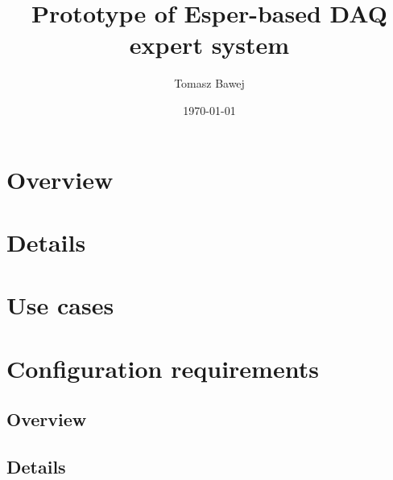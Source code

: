 \documentclass[11pt,oneside,a4paper]{article}
\title{Prototype of Esper-based DAQ expert system}
\date{\today}
\author{Tomasz Bawej}
\begin{document}
\maketitle

\tableofcontents
\clearpage

\section{Overview}

\section{Details}


\section{Use cases}

\section{Configuration requirements}


\subsection{Overview}
\subsection{Details}


\end{document}
